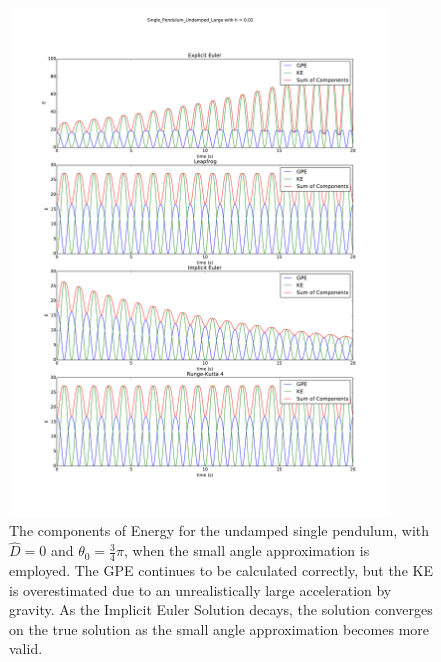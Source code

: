 \documentclass{article}
\begin{document}
\begin{figure}
\begin{center}
\includegraphics[width=0.9\textwidth]{Bad_Energy}
\caption{The components of Energy for the undamped single pendulum, with $\hat{D}=0$ and $\theta_{0} = \frac{3}{4} \pi$, when the small angle approximation is employed. The GPE continues to be calculated correctly, but the KE is overestimated due to an unrealistically large acceleration by gravity. As the Implicit Euler Solution decays, the solution converges on the true solution as the small angle approximation becomes more valid.}
\label{fig:badenergy}
\end{center}
\end{figure}
\end{document}

